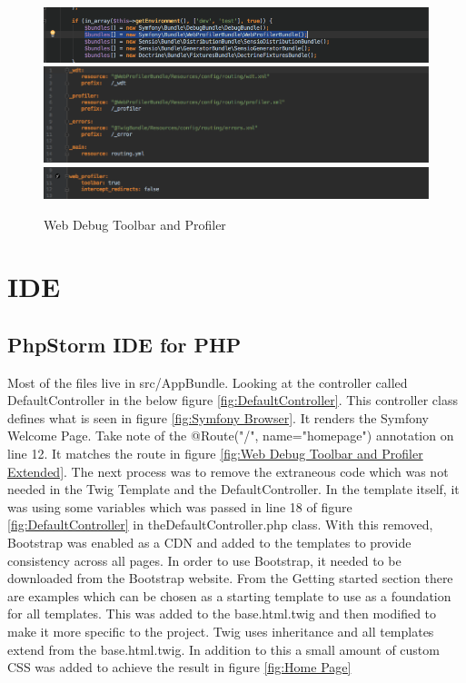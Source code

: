\begin{figure}[htbp]
   \centering
   \includegraphics[width=400pt]{figures/AppKernel.png}
   \includegraphics[width=400pt]{figures/routing_dev.png}
   \includegraphics[width=400pt]{figures/config_dev.png} %
   \caption{Web Debug Toolbar and Profiler}
   \label{fig:Web Debug Toolbar and Profiler}
\end{figure}

\section{IDE}

\subsection{PhpStorm IDE for PHP}

Most of the files live in src/AppBundle. Looking at the controller called DefaultController in the below figure \ref{fig:DefaultController}. This controller class defines what is seen in figure \ref{fig:Symfony Browser}. It renders the Symfony Welcome Page. Take note of the @Route("/", name="homepage") annotation on line 12. It matches the route in figure \ref{fig:Web Debug Toolbar and Profiler Extended}. The next process was to remove the extraneous code which was not needed in the Twig Template and the DefaultController. In the template itself, it was using some variables which was passed in line 18 of figure \ref{fig:DefaultController} in the\newline DefaultController.php class. With this removed, Bootstrap was enabled as a CDN and added to the templates to provide consistency across all pages. In order to use Bootstrap, it needed to be downloaded from the Bootstrap website. From the Getting started section there are examples which can be chosen as a starting template to use as a foundation for all templates. This was added to the base.html.twig and then modified to make it more specific to the project. Twig uses inheritance and all templates extend from the base.html.twig. In addition to this a small amount of custom CSS was added to achieve the result in figure \ref{fig:Home Page}

